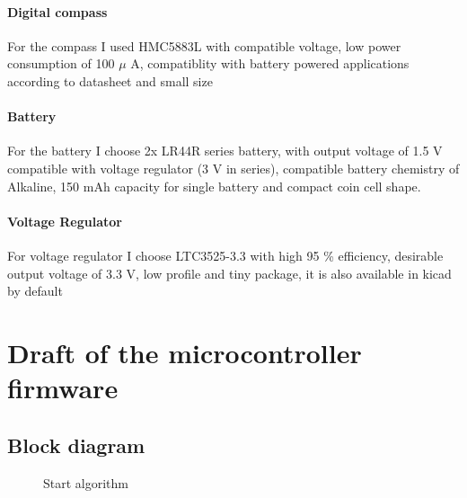 \documentclass{article}
\begin{document}
\paragraph{Digital compass} For the compass I used HMC5883L with compatible
voltage, low power consumption of 100 $\mu$ A, compatiblity with battery powered
applications according to datasheet and small size 
\paragraph{Battery} For the battery I choose 2x LR44R series battery, with output
voltage of 1.5 V compatible with voltage regulator (3 V in series), compatible
battery chemistry of Alkaline, 150 mAh capacity for single battery and compact
coin cell shape. \cite{Battery}
\paragraph{Voltage Regulator} For voltage regulator I choose LTC3525-3.3 with high 95 \%
efficiency, desirable output voltage of 3.3 V, low profile and tiny package, it
is also available in kicad by default \cite{Voltage Regulator}
\section{Draft of the microcontroller firmware}
\subsection{Block diagram}
\begin{figure}[H]
	\caption{Start algorithm}
	\centering
{}
\end{figure}
\end{document}
